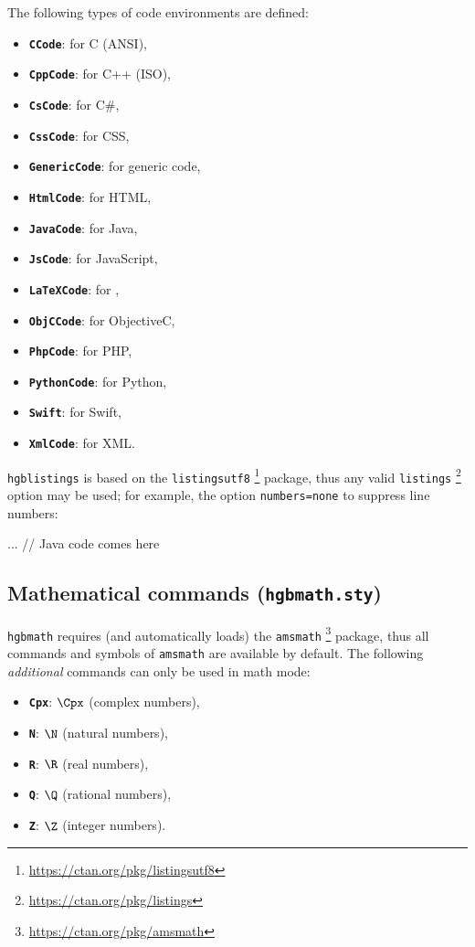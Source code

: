 \documentclass[english]{hgbarticle}
\begin{document}
The following types of code environments are defined:%
%
\begin{itemize}
\item \textbf{\texttt{CCode}}: for C (ANSI),
\item \textbf{\texttt{CppCode}}: for C++ (ISO),
\item \textbf{\texttt{CsCode}}: for C\#,
\item \textbf{\texttt{CssCode}}: for CSS,
\item \textbf{\texttt{GenericCode}}: for generic code,
\item \textbf{\texttt{HtmlCode}}: for HTML,
\item \textbf{\texttt{JavaCode}}: for Java,
\item \textbf{\texttt{JsCode}}: for JavaScript,
\item \textbf{\texttt{LaTeXCode}}: for \latex,
\item \textbf{\texttt{ObjCCode}}: for ObjectiveC,
\item \textbf{\texttt{PhpCode}}: for PHP,
\item \textbf{\texttt{PythonCode}}: for Python,
\item \textbf{\texttt{Swift}}: for Swift,
\item \textbf{\texttt{XmlCode}}: for XML.
\end{itemize}
%
\texttt{hgblistings} is based on the \texttt{listingsutf8}%
\footnote{\url{https://ctan.org/pkg/listingsutf8}}
package, thus any valid \texttt{listings}%
\footnote{\url{https://ctan.org/pkg/listings}}
option may be used; for example, 
the option \texttt{numbers=none} to suppress line numbers:
\begin{LaTeXCode}[numbers=none]
    \begin{JavaCode}[numbers=none]
    ... // Java code comes here
    \end{JavaCode}
\end{LaTeXCode}



\subsection{Mathematical commands (\texttt{hgbmath.sty})}

\texttt{hgbmath} requires (and automatically loads) the \texttt{amsmath}%
\footnote{\url{https://ctan.org/pkg/amsmath}}
package, thus all
commands and symbols of \texttt{amsmath} are available by default.
The following \emph{additional} commands can only be used in math mode:
%
\begin{itemize}
\item \textbf{\texttt{{\bs}Cpx}}: $\Cpx$ (complex numbers),
\item \textbf{\texttt{{\bs}N}}: $\N$ (natural numbers),
\item \textbf{\texttt{{\bs}R}}: $\R$ (real numbers),
\item \textbf{\texttt{{\bs}Q}}: $\Q$ (rational numbers),
\item \textbf{\texttt{{\bs}Z}}: $\Z$ (integer numbers).
\end{itemize}
\end{document}
